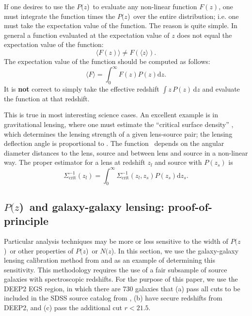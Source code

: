 \documentclass[preprint]{aastex}
\newcommand{\pofz}{$P(z$)}
\newcommand{\Nofz}{$N(z$)}
\begin{document}
If one desires to use the \pofz\ to evaluate any non-linear function $F(z)$,
one must integrate the function times the \pofz\ over the entire distribution;
i.e. one must take the expectation value of the function.  The reason is quite
simple. In general a function evaluated at the expectation value of $z$ does not
equal the expectation value of the function:
\begin{equation}
\langle F(z) \rangle \ne F(\langle z \rangle).
\end{equation}
The expectation value of the function should be computed as follows:
\begin{equation}
\langle F \rangle = \int_{0}^{\infty} F(z) P(z) \mathrm{d}z.
\end{equation}
It is {\bf not} correct to simply take the effective redshift $\int
z\,P(z)\,\mathrm{d}z$ and evaluate
the function at that redshift.

This is true in most interesting science cases.  An excellent example is in
gravitational lensing, where one must estimate the ``critical surface density''
\sigmacrit, which determines the lensing strength of a given lens-source pair; the
lensing deflection angle is proportional to \scinv.  The function
\sigmacrit\ depends on the angular diameter distances to the lens, source and
between lens and source in a non-linear way.  The proper estimator for a lens
at redshift $z_{l}$ and source with $P(z_s)$ is
\begin{equation} \label{eq:calcscrit}
\Sigma^{-1}_{\mathrm{crit}}(z_l) = 
    \int_{0}^{\infty} \Sigma_{\mathrm{crit}}^{-1}(z_l, z_s) P(z_s) \mathrm{d}z_s.
\end{equation}


\subsection{\pofz\ and galaxy-galaxy lensing: proof-of-principle} \label{sec:pofp}

Particular analysis techniques may be more or less sensitive to the width of
\pofz\ or other properties of \pofz\ or \Nofz.  In this section, we use the
galaxy-galaxy lensing calibration method from \cite{man08} and
\citet{Nakajima11} as an example of determining this sensitivity.
This methodology requires the use of a fair subsample of source galaxies with
spectroscopic redshifts.  For the purpose of this paper, we use the DEEP2 EGS
region, in which there are 730 galaxies that (a) pass all cuts to be included
in the SDSS source catalog from \citet{MandelbaumSystematics05}, (b) have
secure redshifts from DEEP2, and (c) pass the additional cut $r<21.5$.
\end{document}
